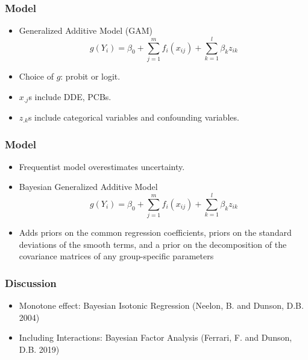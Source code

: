 \documentclass{beamer}
\begin{document}
\begin{frame}
\frametitle{Model}

\begin{itemize}

\item Generalized Additive Model (GAM)
$$g(Y_i) = \beta_0 + \sum_{j=1}^m f_i(x_{ij}) + \sum_{k=1}^l \beta_{k}z_{ik}$$

\item Choice of $g$: probit or logit.
\item $x_{.j}$s include DDE, PCBs.
\item $z_{.k}$s include categorical variables and confounding variables.

\end{itemize}
\end{frame}




\begin{frame}
\frametitle{Model}

\begin{itemize}

\item Frequentist model overestimates uncertainty.
\item Bayesian Generalized Additive Model
$$g(Y_i) = \beta_0 + \sum_{j=1}^m f_i(x_{ij}) + \sum_{k=1}^l \beta_{k}z_{ik}$$

\item Adds priors on the common regression coefficients, priors on the standard deviations of the smooth terms, and a prior on the decomposition of the covariance matrices of any group-specific parameters


\end{itemize}
\end{frame}






\begin{frame}
\frametitle{Discussion}

\begin{itemize}

\item Monotone effect: Bayesian Isotonic Regression (Neelon, B. and Dunson, D.B. 2004)
\item Including Interactions: Bayesian Factor Analysis (Ferrari, F. and Dunson, D.B. 2019)



\end{itemize}
\end{frame}
\end{document}
